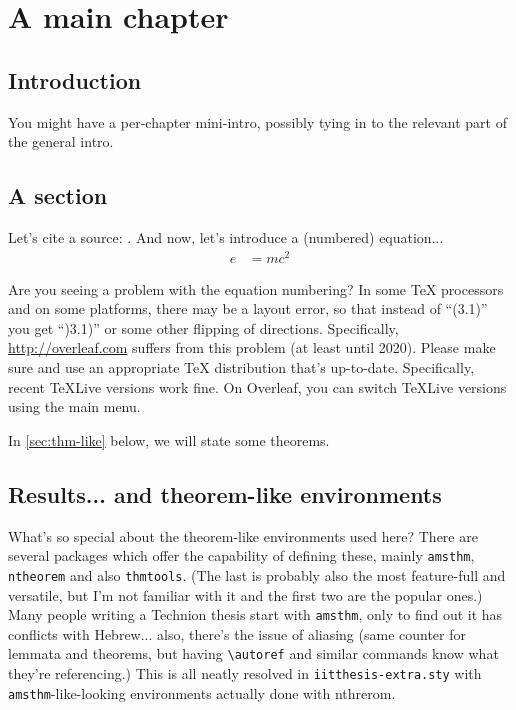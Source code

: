 \chapter{A main chapter}
\label{chap:firstchap}

\section{Introduction}

You might have a per-chapter mini-intro, possibly tying in to the relevant part of the general intro.

\section{A section}

\lipsum[1]

Let's cite a source: \cite{Yao1977}. And now,  let's introduce a (numbered) equation...
\begin{align}
\label{eq:emc2}
e &= mc^2
\end{align}

\begin{note}
	Are you seeing a problem with the equation numbering? In some TeX processors and on some platforms, there may be a layout error, so that instead of ``(3.1)'' you get ``)3.1)'' or some other flipping of directions. Specifically, \url{http://overleaf.com} suffers from this problem (at least until 2020). Please make sure and use an appropriate TeX distribution that's up-to-date. Specifically, recent TeXLive versions work fine. On Overleaf, you can switch TeXLive versions using the main menu.
\end{note}

In \autoref{sec:thm-like} below, we will state some theorems.

\section{Results... and theorem-like environments}
\label{sec:thm-like}

What's so special about the theorem-like environments used here? There are several packages which offer the capability of defining these, mainly \texttt{amsthm}, \texttt{ntheorem} and also \texttt{thmtools}. (The last is probably also the most feature-full and versatile, but I'm not familiar with it and the first two are the popular ones.) Many people writing a Technion thesis start with \texttt{amsthm}, only to find out it has conflicts with Hebrew... also, there's the issue of aliasing (same counter for lemmata and theorems, but having \texttt{{\textbackslash}autoref} and similar commands know what they're referencing.) This is all neatly resolved in \texttt{iitthesis-extra.sty} with \texttt{amsthm}-like-looking environments actually done with nthrerom.

